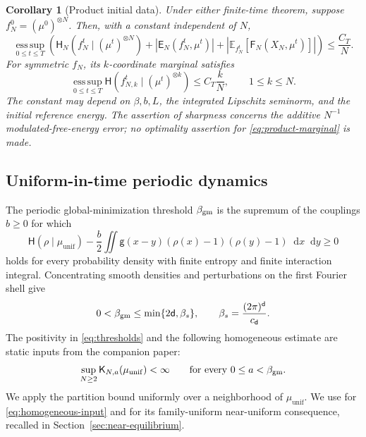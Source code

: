 \documentclass[11pt,reqno]{amsart}
\numberwithin{equation}{section}
\newtheorem{corollary}[corollary]{Corollary}
\theoremstyle{definition}
\theoremstyle{remark}
\newcommand{\E}{\mathbb E}
\newcommand{\g}{\mathsf g}
\renewcommand{\d}{\mathsf d}
\newcommand{\Hr}{\mathsf H}
\newcommand{\Fr}{\mathsf F}
\newcommand{\Er}{\mathsf E}
\newcommand{\K}{\mathsf K}
\newcommand{\muunif}{\mu_{\mathrm{unif}}}
\newcommand{\esssup}{\operatorname*{ess\,sup}}
\newcommand{\dd}{\mathop{}\!\mathrm d}
\newcommand{\abs}[1]{\left\lvert#1\right\rvert}
\newcommand{\revision}[1]{{\ifdefined\MarkedRevision\color{red}\fi#1}}
\begin{document}
\begin{corollary}[Product initial data]\label{cor:product}
Under either finite-time theorem, suppose $f_N^0=(\mu^0)^{\otimes N}$. Then, with a constant independent of $N$,
\begin{equation}\label{eq:product-conclusion}
 \esssup_{0\leq t\leq T}
 \left(\Hr_N(f_N^t\mid(\mu^t)^{\otimes N})+
 |\Er_N(f_N^t,\mu^t)|+
 \abs{\E_{f_N^t}[\Fr_N(X_N,\mu^t)]}\right)\leq\frac{C_T}{N}.
\end{equation}
For symmetric $f_N$, its $k$-coordinate marginal satisfies
\begin{equation}\label{eq:product-marginal}
 \esssup_{0\leq t\leq T}\Hr(f_{N,k}^t\mid(\mu^t)^{\otimes k})
 \leq C_T\frac{k}{N},\qquad 1\leq k\leq N.
\end{equation}
The constant may depend on $\beta,b,L$, the integrated Lipschitz seminorm, and the initial reference energy. The assertion of sharpness concerns the additive $N^{-1}$ modulated-free-energy error; no optimality assertion for \eqref{eq:product-marginal} is made.
\end{corollary}

\subsection{Uniform-in-time periodic dynamics}
The periodic global-minimization threshold $\beta_{\rm gm}$ is the supremum of the couplings $b\geq0$ for which
\begin{equation}\label{eq:beta-gm}
 \Hr(\rho\mid\muunif)-\frac b2\iint\g(x-y)(\rho(x)-1)(\rho(y)-1)\dd x\dd y\geq0
\end{equation}
holds for every probability density with finite entropy and finite interaction integral. Concentrating smooth densities and perturbations on the first Fourier shell give
\begin{equation}\label{eq:thresholds}
 0<\beta_{\rm gm}\leq\min\{2\d,\beta_s\},\qquad
 \beta_s=\frac{(2\pi)^\d}{c_\d}.
\end{equation}
The positivity in \eqref{eq:thresholds} and the following homogeneous estimate are static inputs from the companion paper:
\begin{equation}\label{eq:homogeneous-input}
 \sup_{N\geq2}\K_{N,a}(\muunif)<\infty\qquad\text{for every }0\leq a<\beta_{\rm gm}.
\end{equation}
\revision{We apply the partition bound uniformly over a neighborhood of $\muunif$.} We use \revision{\cite[Proposition~4.6, pp.~29--30]{PartI}} for \eqref{eq:homogeneous-input} and \revision{\cite[Proposition~5.8, pp.~34--35]{PartI}} for its family-uniform near-uniform consequence, recalled in Section~\ref{sec:near-equilibrium}.
\end{document}
